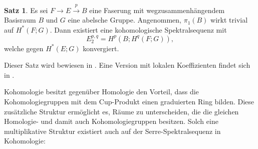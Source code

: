 \documentclass[11pt, a4paper, german]{article}
\theoremstyle{definition}
\newtheorem{satz}[lem]{Satz}
\theoremstyle{remark}
\begin{document}
\begin{satz}
  Es sei $F \to E \xrightarrow{p} B$ eine Faserung mit wegzusammenhängendem Basisraum $B$ und $G$ eine abelsche Gruppe.
  Angenommen, $\pi_1(B)$ wirkt trivial auf $H^*(F; G)$.
  Dann existiert eine kohomologische Spektralsequenz mit
  \[ E_2^{p,q} = H^p(B; H^q(F; G)), \]
  welche gegen $H^*(E; G)$ konvergiert.
\end{satz}

Dieser Satz wird bewiesen in \cite[Thm 1.14]{hatcher:ss}.
Eine Version mit lokalen Koeffizienten findet sich in \cite[Thm 5.2]{mccleary:ss}.

Kohomologie besitzt gegenüber Homologie den Vorteil, dass die Kohomologiegruppen mit dem Cup-Produkt einen graduierten Ring bilden.
Diese zusätzliche Struktur ermöglicht es, Räume zu unterscheiden, die die gleichen Homologie- und damit auch Kohomologiegruppen besitzen.
Solch eine multiplikative Struktur existiert auch auf der Serre-Spektralsequenz in Kohomologie:
\end{document}
